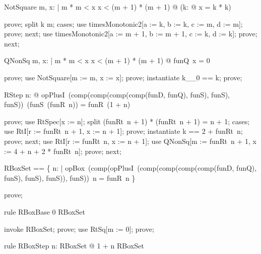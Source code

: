\documentclass{article}
\begin{document}
\begin{theorem}{NotSquare}
  \forall m, x: \nat | m * m < x \land x < (m + 1) * (m + 1) @ \lnot (\exists k: \nat @ x = k * k)
\end{theorem}

\begin{zproof}
prove;
split k \leq m;
cases;
use timesMonotonic2[a := k, b := k, c := m, d := m];
prove;
next;
use timesMonotonic2[a := m + 1, b := m + 1, c := k, d := k];
prove;
next;
\end{zproof}

\begin{theorem}{QNonSq}
  \forall m, x: \nat | m * m < x \land x < (m + 1) * (m + 1) @ funQ~x = 0
\end{theorem}

\begin{zproof}
prove;
use NotSquare[m := m, x := x];
prove;
instantiate k\_\_0 == k;
prove;
\end{zproof}

\begin{theorem}{RStep}
  \forall n: \nat @ opPlusI~(comp(comp(comp(comp(funD, funQ), funS), funS), funS))~(funS~(funR~n)) = funR~(1 + n)
\end{theorem}

\begin{zproof}
prove;
use RtSpec[x := n];
split (funRt~n + 1) * (funRt~n + 1) = n + 1;
cases;
use RtI[r := funRt~n + 1, x := n + 1];
prove;
instantiate k == 2 + funRt~n;
prove;
next;
use RtI[r := funRt~n, x := n + 1];
use QNonSq[m := funRt~n + 1, x := 4 + n + 2 * funRt~n];
prove;
next;
\end{zproof}


\begin{zed}
  RBoxSet == \{ n: \nat | opBox~(comp(opPlusI~(comp(comp(comp(comp(funD, funQ), funS), funS), funS)), funS))~n = funR~n \}
\end{zed}

\begin{zproof}
prove;
\end{zproof}

\begin{theorem}{rule RBoxBase}
  0 \in RBoxSet
\end{theorem}

\begin{zproof}
invoke RBoxSet;
prove;
use RtSq[m := 0];
prove;
\end{zproof}

\begin{theorem}{rule RBoxStep}
  \forall n: RBoxSet @ 1 + n \in RBoxSet
\end{theorem}
\end{document}
